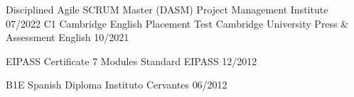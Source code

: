 

\begin{cvhonors}
  \cvhonor
    {Disciplined Agile SCRUM Master (DASM)} %
    {Project Management Institute} %
    {} %
    {07/2022} %
  \cvhonor
    {C1 Cambridge English Placement Test} %
    {Cambridge University Press \& Assessment English} %
    {} %
    {10/2021} %

  \cvhonor
    {EIPASS Certificate 7 Modules Standard} %
    {EIPASS} %
    {} %
    {12/2012} %

    
  \cvhonor
    {B1E Spanish Diploma} %
    {Instituto Cervantes} %
    {} %
    {06/2012} %


\end{cvhonors}